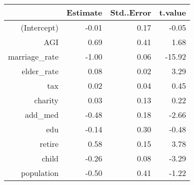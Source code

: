 \begin{table}[ht]
\centering
\begin{tabular}{rrrr}
  \hline
 & Estimate & Std..Error & t.value \\ 
  \hline
(Intercept) & -0.01 & 0.17 & -0.05 \\ 
  AGI & 0.69 & 0.41 & 1.68 \\ 
  marriage\_rate & -1.00 & 0.06 & -15.92 \\ 
  elder\_rate & 0.08 & 0.02 & 3.29 \\ 
  tax & 0.02 & 0.04 & 0.45 \\ 
  charity & 0.03 & 0.13 & 0.22 \\ 
  add\_med & -0.48 & 0.18 & -2.66 \\ 
  edu & -0.14 & 0.30 & -0.48 \\ 
  retire & 0.58 & 0.15 & 3.78 \\ 
  child & -0.26 & 0.08 & -3.29 \\ 
  population & -0.50 & 0.41 & -1.22 \\ 
   \hline
\end{tabular}
\end{table}
